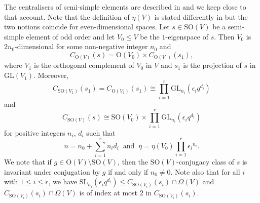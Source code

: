 \documentclass{amsart}
\theoremstyle{plain}\newtheorem{Theorem}{Theorem}[section]
\theoremstyle{plain}\newtheorem{Conjecture}[Theorem]{Conjecture}
\theoremstyle{plain}\newtheorem{Corollary}[Theorem]{Corollary}
\theoremstyle{plain}\newtheorem{Lemma}[Theorem]{Lemma}
\theoremstyle{plain}\newtheorem{Proposition}[Theorem]{Proposition}
\theoremstyle{definition}\newtheorem{Definition}[Theorem]{Definition}
\theoremstyle{definition}\newtheorem{Example}[Theorem]{Example}
\theoremstyle{definition}\newtheorem{Examples}[Theorem]{Examples}
\theoremstyle{definition}\newtheorem{Exercise}[Theorem]{Exercise}
\theoremstyle{definition}\newtheorem{Notation}[Theorem]{Notation}
\theoremstyle{definition}\newtheorem{Remark}[Theorem]{Remark}
\theoremstyle{definition}\newtheorem{Remarks}[Theorem]{Remarks}
\def\GL{\mathrm{GL}}
\def \O{\mathrm{O}}
\def\SL{\mathrm{SL}}
\def\SO{\mathrm{SO}}
\numberwithin{equation}{section}
\begin{document}
The centralisers of  semi-simple elements  are described in \cite[Sec.~1]{FoSri-classical}  and we  keep  close to that account.  Note that  the  definition  of $\eta(V)$ is  stated differently in  \cite{FoSri-classical}
but  the two notions coincide  for even-dimensional  spaces. Let $s\in  \SO(V)$  be a semi-simple element of odd order and let  $V_0 \leq  V$  be the $1$-eigenspace of   $s$.
Then $V_0$ is $2n_0$-dimensional  for some  non-negative integer  $n_0$ and 
$$C_{\O(V)}  (s)  =  \O(V_0) \times C_{\O(V_1)} (s_1), $$ where  $V_1 $ is the orthogonal 
complement of    $V_0$ in $V$ and  $s_1$ is the projection   of $s$  in $\GL(V_1) $.  Moreover, 
$$ C_{\SO(V_1)}(s_1) = C_{\O(V_1)} (s_1)  \cong  \prod_{i=1}^r\GL_{n_i}  (\epsilon_iq^{d_i})$$ and
$$ C_{\SO(V)}(s)   \cong   \SO(V_0) \times   \prod_{i=1}^r\GL_{n_i} (\epsilon_iq^{d_i})$$  for positive integers  $n_i$, $d_i$ such that  
\begin{equation} n=  n_0 +  \sum_{i=1}^{r} n_i d_i  {\ \text{ and } \ } \eta    =  \eta (V_0) \prod_{i=1}^r {\epsilon_i}^{n_i}.  \end{equation}
  We  note that  if  $ g  \in  \O(V) \setminus  \SO(V)$, then  the $\SO(V)$-conjugacy class of  $s $  is invariant under  conjugation by $g$ if and only if  $n_0 \ne 0$.  Note  also that for all   $i$ with $1\leq i \leq r$, we have $\SL_{n_i}(\epsilon_i q^{d_i}) \leq C_{\SO(V_i)}(s_i) \cap \Omega (V) $  and $ C_{\SO(V_i)}(s_i) \cap \Omega (V)   $ is  of index at  most $2$ in  $ C_{\SO(V_i)}(s_i)$. 
\end{document}
